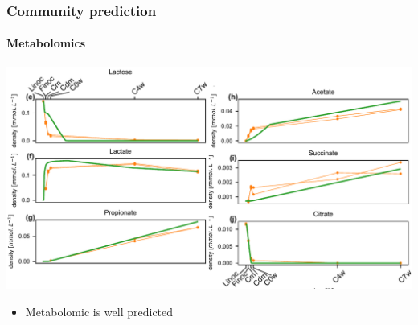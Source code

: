 \documentclass[8pt]{beamer}
\begin{document}
\begin{frame}
\frametitle{Community prediction}
\framesubtitle{Metabolomics}
\begin{adjustwidth}{-0.6cm}{}
\includegraphics[width=1.1\textwidth]{figures/community-pred-metabolo.pdf}
\end{adjustwidth}
\begin{block}{}
\begin{itemize}
\item Metabolomic is well predicted 
\end{itemize}
\end{block}
\end{frame}
\end{document}
